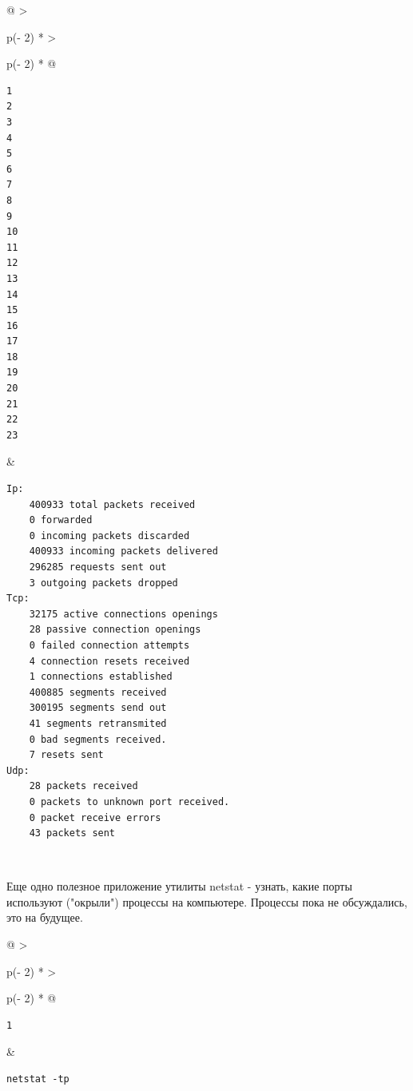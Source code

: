 \documentclass{report}
\begin{document}
\begin{longtable}[]{@{}
  >{\raggedright\arraybackslash}p{(\columnwidth - 2\tabcolsep) * }
  >{\raggedright\arraybackslash}p{(\columnwidth - 2\tabcolsep) * }@{}}
\toprule
\endhead
\begin{minipage}[t]{\linewidth}\raggedright
\begin{verbatim}
1
2
3
4
5
6
7
8
9
10
11
12
13
14
15
16
17
18
19
20
21
22
23
\end{verbatim}
\end{minipage} & \begin{minipage}[t]{\linewidth}\raggedright
\begin{verbatim}
Ip:
    400933 total packets received
    0 forwarded
    0 incoming packets discarded
    400933 incoming packets delivered
    296285 requests sent out
    3 outgoing packets dropped
Tcp:
    32175 active connections openings
    28 passive connection openings
    0 failed connection attempts
    4 connection resets received
    1 connections established
    400885 segments received
    300195 segments send out
    41 segments retransmited
    0 bad segments received.
    7 resets sent
Udp:
    28 packets received
    0 packets to unknown port received.
    0 packet receive errors
    43 packets sent
\end{verbatim}
\end{minipage} \\ \addlinespace
\bottomrule
\end{longtable}

Еще одно полезное приложение утилиты netstat - узнать, какие порты
используют ("окрыли") процессы на компьютере. Процессы пока не
обсуждались, это на будущее.

\begin{longtable}[]{@{}
  >{\raggedright\arraybackslash}p{(\columnwidth - 2\tabcolsep) * }
  >{\raggedright\arraybackslash}p{(\columnwidth - 2\tabcolsep) * }@{}}
\toprule
\endhead
\begin{minipage}[t]{\linewidth}\raggedright
\begin{verbatim}
1
\end{verbatim}
\end{minipage} & \begin{minipage}[t]{\linewidth}\raggedright
\begin{verbatim}
netstat -tp
\end{verbatim}
\end{minipage} \\ \addlinespace
\bottomrule
\end{longtable}
\end{document}
